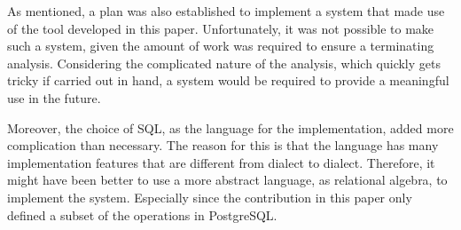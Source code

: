 As mentioned, a plan was also established to implement a system that made use of the tool developed in this paper.
Unfortunately, it was not possible to make such a system, given the amount of work was required to ensure a terminating analysis.
Considering the complicated nature of the analysis, which quickly gets tricky if carried out in hand, a system would be required to provide a meaningful use in the future.


Moreover, the choice of SQL, as the language for the implementation, added more complication than necessary.
The reason for this is that the language has many implementation features that are different from dialect to dialect.
Therefore, it might have been better to use a more abstract language, as relational algebra, to implement the system.
Especially since the contribution in this paper only defined a subset of the operations in PostgreSQL.